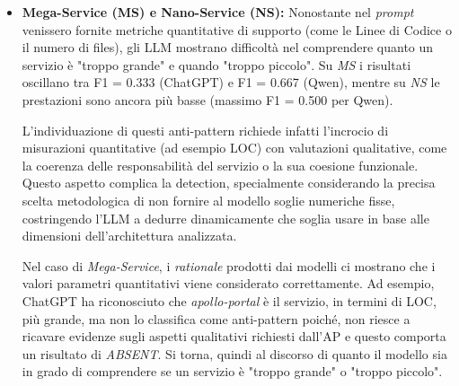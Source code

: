 \begin{itemize}
    In generale quindi, si potrebbe concludere che si potrebbe esplicitare una condizione più stretta per quanto concerne la definizione nel \textit{prompt} in iterazioni successive, poiché in quella attuale la condizione più stretta (condividere le stesse tabelle e non solo lo stesso database) risulta essere accessoria.
    Specificando che, l'AP risulta comunque essere interpretabile e bisognerebbe capire quanto gli autori del GT sono stati severi nel rilevare l'AP.
    
    Infine, come nel caso di \textit{Shared Libraries}, anche qui la numerosità dei campioni è troppo ridotta per valutare in modo robusto il comportamento del modello, poiché il dataset presenta un solo caso positivo.
    

    \item \textbf{Mega-Service (MS) e Nano-Service (NS):} Nonostante nel \textit{prompt} venissero fornite metriche quantitative di supporto (come le Linee di Codice o il numero di files), gli LLM mostrano difficoltà nel comprendere quanto un servizio è "troppo grande" e quando "troppo piccolo". Su \textit{MS} i risultati oscillano tra F1 = 0.333 (ChatGPT) e F1 = 0.667 (Qwen), mentre su \textit{NS} le prestazioni sono ancora più basse (massimo F1 = 0.500 per Qwen). 

    L’individuazione di questi anti-pattern richiede infatti l’incrocio di misurazioni quantitative (ad esempio LOC) con valutazioni qualitative, come la coerenza delle responsabilità del servizio o la sua coesione funzionale. Questo aspetto complica la detection, specialmente considerando la precisa scelta metodologica di non fornire al modello soglie numeriche fisse, costringendo l’LLM a dedurre dinamicamente che soglia usare in base alle dimensioni dell'architettura analizzata.
    
    Nel caso di \textit{Mega-Service}, i \textit{rationale} prodotti dai modelli ci mostrano che i valori parametri quantitativi viene considerato correttamente. Ad esempio, ChatGPT ha riconosciuto che \textit{apollo-portal} è il servizio, in termini di LOC, più grande, ma non lo classifica come anti-pattern poiché, non riesce a ricavare evidenze sugli aspetti qualitativi richiesti dall'AP e questo comporta un risultato di \textit{ABSENT}. Si torna, quindi al discorso di quanto il modello sia in grado di comprendere se un servizio è "troppo grande" o "troppo piccolo".
    

\end{itemize}
